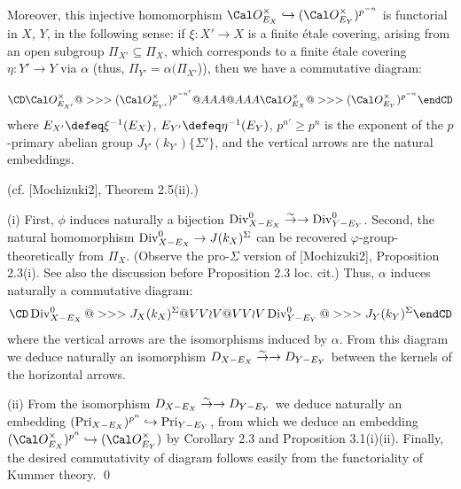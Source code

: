 Moreover, this injective homomorphism
$\Cal O_{E_X}^{\times} \hookrightarrow (\Cal O_{E_Y}^{\times})^{p^{-n}}$
is functorial in $X$, $Y$, in the following sense: if $\xi :X'\to X$ is a finite 
\'etale covering, arising from an open subgroup $\Pi_{X'}\subseteq \Pi_X$, which 
corresponds to a finite \'etale covering $\eta:Y'\to Y$ via $\alpha$ (thus, 
$\Pi_{Y'}=\alpha (\Pi_{X'}$)), then we have a commutative diagram:

$$
\CD
\Cal O_{E_{X'}}^{\times} @>>> (\Cal O_{E_{Y'}}^{\times})^{p^{-n'}}\\
@AAA                        @AAA  \\
\Cal O_{E_X}^{\times} @>>>  (\Cal O_{E_Y}^{\times})^{p^{-n}}\\
\endCD
$$
where $E_{X'}\defeq \xi ^{-1}(E_X)$, $E_{Y'}\defeq \eta ^{-1}(E_Y)$, 
$p^{n'}\ge p^n$ is the exponent %
of the $p$-primary abelian group
$J_{Y'}(k_{Y'})\{\Sigma'\}$, and 
the vertical arrows are the natural embeddings.
\endproclaim


 (cf. [Mochizuki2], Theorem 2.5(ii).)  

\noindent
(i) First, 
$\phi$ induces naturally a bijection  $\operatorname {Div} _{X- E_X}^0
\overset \sim \to \rightarrow \operatorname {Div} _{Y- E_Y}^0$. %
Second, the natural
homomorphism $\operatorname {Div} _{X- E_X}^0\to J(k_X)^{\Sigma}$ can be recovered
$\varphi$-group-theoretically from $\Pi_X$. 
(Observe the pro-$\Sigma$ version of [Mochizuki2], Proposition 2.3(i). 
See also the discussion before Proposition 2.3 loc. cit.) 
Thus, $\alpha$ induces naturally a commutative diagram:
$$
\CD
\Div _{X- E_X}^0 @>>>  J_X(k_X)^{\Sigma}\\
@VV{\wr}V            @VV{\wr}V  \\
\Div _{Y- E_Y}^0 @>>> J_Y(k_Y)^{\Sigma}\\
\endCD
$$
where the vertical arrows are the isomorphisms induced 
by $\alpha$. From 
this diagram we deduce naturally an isomorphism $D_{X- E_X}
\overset \sim \to \rightarrow D_{Y- E_Y}$ between the kernels of the horizontal arrows. 

\noindent
(ii) From the isomorphism $D_{X- E_X}\overset \sim \to \rightarrow D_{Y- E_Y}$ 
we deduce naturally an embedding 
$(\operatorname {Pri}_{X- E_X})^{p^{n}}\hookrightarrow \operatorname {Pri}_{Y- E_Y}$, from which
we deduce an embedding
$(\Cal O_{E_X}^{\times})^{p^{n}}\hookrightarrow (\Cal O_{E_Y}^{\times})$ 
by Corollary 2.3 and Proposition 3.1(i)(ii). 
Finally, the desired commutativity of diagram follows 
easily from the functoriality of Kummer theory.
\qed
\enddemo


